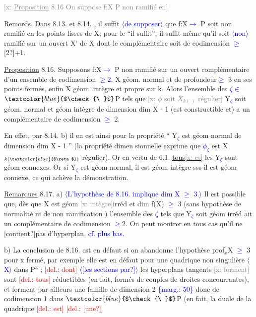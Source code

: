 \documentclass[11pt]{article}
\newcommand{\scanpage}[1]{\par\bigskip\noindent{\small\sffamily[scan #1]}\par}
\newcommand{\mspage}[1]{{\small\sffamily[p.\,#1]}}
\newcommand{\hand}[1]{\textcolor{blue}{#1}}
\newcommand{\inserted}[2][]{\textcolor{blue}{$\langle$#2$\rangle$}}
\newcommand{\margin}[1]{\textcolor{blue}{\{\textsf{marg.:} #1\}}}
\newcommand{\deleted}[1]{\textcolor{red}{[\textsf{del.:} #1]}}
\newcommand{\xout}[1]{\textcolor{gray}{[\textsf{x:} #1]}}
\newcommand{\uline}[1]{\underline{#1}}
\newcommand{\unsure}[1]{[#1?]}
\begin{document}
\mspage{49}

\clearpage
\scanpage{25/50}
\mspage{46}

\xout{\uline{Proposition} 8.16 On suppose f:X P non ramifié en}

Remords. Dans 8.13. et 8.14. , il suffit \inserted{de supposer} que f:X\hand{$\to$} P soit non
ramifié en les points lisses de X; pour le ``il suffit'', il suffit même
qu'il soit \inserted{non} ramifié sur un ouvert X' de X dont le complémentaire soit
de codimension \hand{$\geqslant$} \unsure{2}+1.

\uline{Proposition} 8.16. Supposons f:X\hand{$\to$} P non ramifié sur un ouvert
complémentaire d'un ensemble de codimension \hand{$\geqslant 2$,} X géom. normal et
de profondeur\hand{$\geqslant$} 3 en ses points fermés, enfin X géom. intègre et propre
sur k. Alors l'ensemble des \hand{$\zeta \in$} $\hand{$\check{\ }$}$P tels que \xout{$\phi$ soit $X_{k(\ )}$ régulier}
Y\hand{$_\zeta$} soit géom. normal et géom intègre de dimension dim X - 1 (est
constructible et) a un complémentaire de codimension \hand{$\geqslant$} 2.

En effet, par 8.14. b) il en est ainsi pour la propriété
`` Y\hand{$_\zeta$} est géom normal de dimension dim X - 1 '' (la propriété dimen
sionnelle exprime que \hand{$\phi_\zeta$} est X$_{k(\hand{$\zeta$})}$-régulier). Or en vertu de 6.1.
\uline{tous\xout{es}} les Y\hand{$_\zeta$} sont géom connexes. Or si Y\hand{$_\zeta$} est géom normal, il est
géom intègre sss il est géom connexe, ce qui achève la démonstration.

\uline{Remarques} 8.17. a) \inserted[typed]{L'hypothèse de 8.16. implique dim X \hand{$\geqslant$} 3.} Il est possible que, dès que X est géom \xout{intègre}irréd
et dim f(X) \hand{$\geqslant$} 3 (sans hypothèse de normalité ni de non ramification )
l'ensemble des \hand{$\zeta$} tels que Y\hand{$_\zeta$} soit géom irréd ait un complémentaire
de codimension \hand{$\geqslant$}2. On peut montrer en tous cas qu'il ne \unsure{contient}pas
d'hyperplan, \hand{cf. plus bas.}

b) La conclusion de 8.16. est en défaut si on abandonne
l'hypothèse prof$_x$X \hand{$\geqslant$} 3 pour x fermé, par exemple elle est en défaut pour
une quadrique non singulière \inserted{X} dans P$^3$ ; \deleted{dont} \inserted{\unsure{les sections par}} les hyperplans tangents
\xout{forment} sont \deleted{tous} réductibles (en fait, formés de couples de droites
concourrantes), et forment par ailleurs une famille de dimension 2
\margin{50} donc de codimension 1 dans $\hand{$\check{\ }$}$P (en fait, la duale de la quadrique \deleted{est} \deleted{\unsure{une}}
\end{document}
